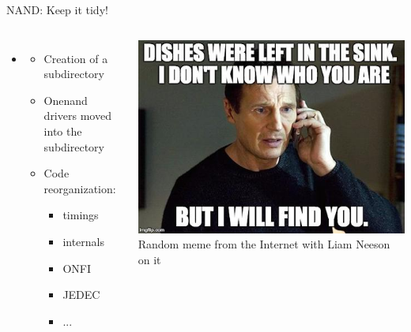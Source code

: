 \documentclass[aspectratio=169,obeyspaces,spaces,hyphens,dvipsnames]{beamer}
\begin{document}
\begin{frame}{NAND: Keep it tidy!}
  \begin{columns}
    \begin{itemize}
    \item {}
      \begin{itemize}
      \item Creation of a  subdirectory
      \item Onenand drivers moved into the  subdirectory
      \item Code reorganization:
        \begin{itemize}
        \item timings
        \item internals
        \item ONFI
        \item JEDEC
        \item ...
        \end{itemize}
      \end{itemize}
    \end{itemize}
    \begin{center}
      \includegraphics[scale=0.35]{dishes-in-sink-meme.jpg}
                      {\fontsize{5}{6}\selectfont Random meme from the
                        Internet with Liam Neeson on it}
    \end{center}
  \end{columns}
\end{frame}
\end{document}
